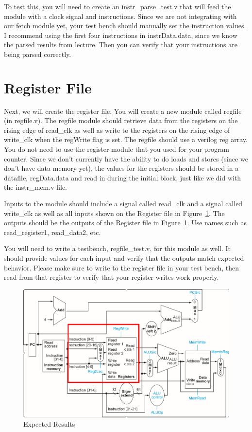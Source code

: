 To test this, you will need to create an instr\_parse\_test.v that will feed the module with a clock signal and instructions.  Since we are not integrating with our fetch module yet, your test bench should manually set the instruction values.  I recommend using the first four instructions in instrData.data, since we know the parsed results from lecture.  Then you can verify that your instructions are being parsed correctly.

\section{Register File}

Next, we will create the register file.  You will create a new module called regfile (in regfile.v).  The regfile module should retrieve data from the registers on the rising edge of read\_clk as well as write to the registers on the rising edge of write\_clk when the regWrite flag is set.  The regfile should use a verilog reg array.  You do not need to use the register module that you used for your program counter.  Since we don't currently have the ability to do loads and stores (since we don't have data memory yet), the values for the registers should be stored in a datafile, regData.data and read in during the initial block, just like we did with the instr\_mem.v file.  

Inputs to the module should include a signal called read\_clk and a signal called write\_clk as well as all inputs shown on the Register file in Figure~\ref{fig:register_file_cutout}.  The outputs should be the outputs of the Register file in Figure~\ref{fig:register_file_cutout}.  Use names such as read\_register1, read\_data2, etc.

You will need to write a testbench, regfile\_test.v, for this module as well.  It should provide values for each input and verify that the outputs match expected behavior.  Please make sure to write to the register file in your test bench, then read from that register to verify that your register writes work properly.

\begin{figure}
	\caption{Expected Results}\label{fig:register_file_cutout}
	\begin{center}
		\includegraphics[width=4.75in]{../images/register_file_cutout.png}
	\end{center}
\end{figure} 


